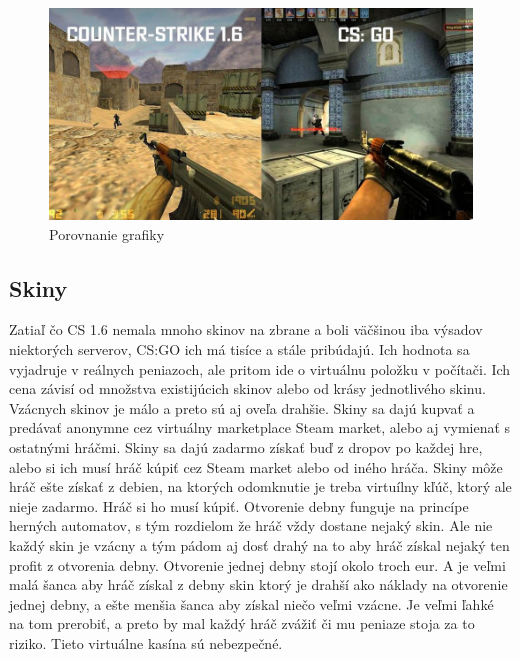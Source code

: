 \documentclass[10pt,twoside,slovak,a4paper]{article}
\begin{document}
\begin{figure}[tbh]
\centering
\includegraphics[scale=0.4]{1.6vsgo.jpg}
\caption{Porovnanie grafiky}
\label{f:grafika}
\end{figure}

\subsection{Skiny} \label{porovnanie:skiny}

Zatiaľ čo CS 1.6 nemala mnoho skinov na zbrane a boli väčšinou iba výsadov niektorých serverov, CS:GO ich má tisíce a stále pribúdajú. Ich hodnota sa vyjadruje v reálnych peniazoch, ale pritom ide o virtuálnu položku v počítači. Ich cena závisí od množstva existijúcich skinov alebo od krásy jednotlivého skinu. Vzácnych skinov je málo a preto sú aj oveľa drahšie. Skiny sa dajú kupvať a predávať anonymne cez virtuálny marketplace Steam market, alebo aj vymienať s ostatnými hráčmi.
Skiny sa dajú zadarmo získať buď z dropov po každej hre, alebo si ich musí hráč kúpiť cez Steam market alebo od iného hráča. Skiny môže hráč ešte získať z debien, na ktorých odomknutie je treba virtuílny kľúč, ktorý ale nieje zadarmo. Hráč si ho musí kúpiť. Otvorenie debny funguje na princípe herných automatov, s tým rozdielom že hráč vždy dostane nejaký skin. Ale nie každý skin je vzácny a tým pádom aj dosť drahý na to aby hráč získal nejaký ten profit z otvorenia debny. Otvorenie jednej debny stojí okolo troch eur. A je veľmi malá šanca aby hráč získal z debny skin ktorý je drahší ako náklady na otvorenie jednej debny, a ešte menšia šanca aby získal niečo veľmi vzácne. Je veľmi ľahké na tom prerobiť, a preto by mal každý hráč zvážiť či mu peniaze stoja za to riziko. Tieto virtuálne kasína sú nebezpečné.
\end{document}
